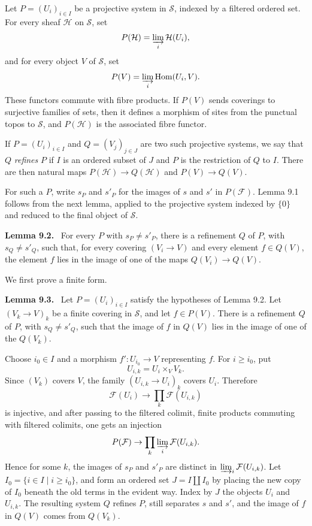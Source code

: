 \documentclass[11pt]{article}
\newcommand{\Hom}{\operatorname{Hom}}
\newenvironment{statement}[1]{\par\medskip\noindent\textbf{#1.}\ }{\par\medskip}
\begin{document}
Let \(P=(U_i)_{i\in I}\) be a projective system in \(\mathscr S\), indexed by a filtered ordered set. For every sheaf \(\mathcal H\) on \(\mathscr S\), set
\[
 P(\mathcal H)=\varinjlim_i\mathcal H(U_i),
\]
and for every object \(V\) of \(\mathscr S\), set
\[
 P(V)=\varinjlim_i\Hom(U_i,V).
\]
These functors commute with fibre products. If \(P(V)\) sends coverings to surjective families of sets, then it defines a morphism of sites from the punctual topos to \(\mathscr S\), and \(P(\mathcal H)\) is the associated fibre functor.

If \(P=(U_i)_{i\in I}\) and \(Q=(V_j)_{j\in J}\) are two such projective systems, we say that \(Q\) \emph{refines} \(P\) if \(I\) is an ordered subset of \(J\) and \(P\) is the restriction of \(Q\) to \(I\). There are then natural maps \(P(\mathcal H)\to Q(\mathcal H)\) and \(P(V)\to Q(V)\).

For such a \(P\), write \(s_P\) and \(s'_P\) for the images of \(s\) and \(s'\) in \(P(\mathcal F)\). Lemma 9.1 follows from the next lemma, applied to the projective system indexed by \(\{0\}\) and reduced to the final object of \(\mathscr S\).

\begin{statement}{Lemma 9.2}
For every \(P\) with \(s_P\ne s'_P\), there is a refinement \(Q\) of \(P\), with \(s_Q\ne s'_Q\), such that, for every covering \((V_i\to V)\) and every element \(f\in Q(V)\), the element \(f\) lies in the image of one of the maps \(Q(V_i)\to Q(V)\).
\end{statement}

We first prove a finite form.

\begin{statement}{Lemma 9.3}
Let \(P=(U_i)_{i\in I}\) satisfy the hypotheses of Lemma 9.2. Let \((V_k\to V)_k\) be a finite covering in \(\mathscr S\), and let \(f\in P(V)\). There is a refinement \(Q\) of \(P\), with \(s_Q\ne s'_Q\), such that the image of \(f\) in \(Q(V)\) lies in the image of one of the \(Q(V_k)\).
\end{statement}
Choose \(i_0\in I\) and a morphism \(f':U_{i_0}\to V\) representing \(f\). For \(i\ge i_0\), put
\[
 U_{i,k}=U_i\times_V V_k.
\]
Since \((V_k)\) covers \(V\), the family \((U_{i,k}\to U_i)_k\) covers \(U_i\). Therefore
\[
 \mathcal F(U_i)\to\prod_k\mathcal F(U_{i,k})
\]
is injective, and after passing to the filtered colimit, finite products commuting with filtered colimits, one gets an injection
\[
 P(\mathcal F)\to\prod_k\varinjlim_i\mathcal F(U_{i,k}).
\]
Hence for some \(k\), the images of \(s_P\) and \(s'_P\) are distinct in \(\varinjlim_i\mathcal F(U_{i,k})\). Let \(I_0=\{i\in I\mid i\ge i_0\}\), and form an ordered set \(J=I\amalg I_0\) by placing the new copy of \(I_0\) beneath the old terms in the evident way. Index by \(J\) the objects \(U_i\) and \(U_{i,k}\). The resulting system \(Q\) refines \(P\), still separates \(s\) and \(s'\), and the image of \(f\) in \(Q(V)\) comes from \(Q(V_k)\).
\end{document}
